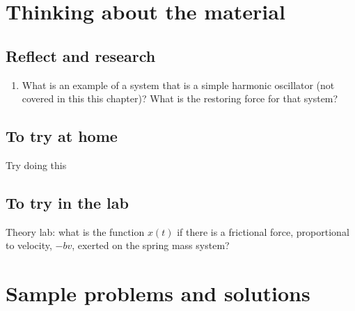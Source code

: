 \newpage
\section{Thinking about the material}
\subsection{Reflect and research}
\begin{enumerate}
\item What is an example of a system that is a simple harmonic oscillator (not covered in this this chapter)? What is the restoring force for that system?
\end{enumerate}
\subsection{To try at home}

\begin{tQuestion}Try doing this \end{tQuestion}

\subsection{To try in the lab}
Theory lab: what is the function $x(t)$ if there is a frictional force, proportional to velocity, $-bv$, exerted on the spring mass system?
\newpage
\section{Sample problems and solutions}

